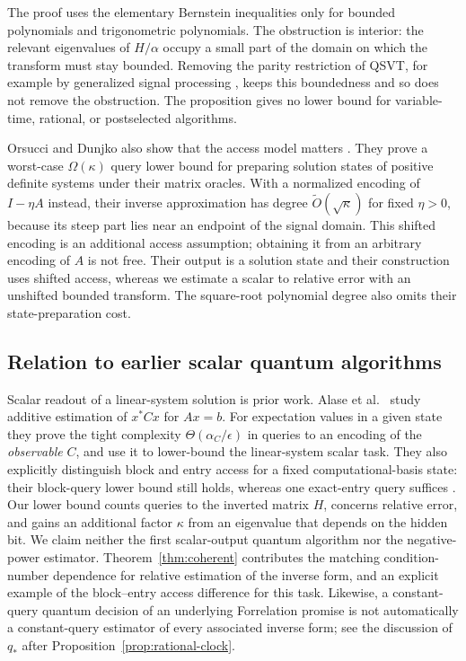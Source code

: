 The proof uses the elementary Bernstein inequalities only for bounded
polynomials and trigonometric polynomials.  The obstruction is interior: the relevant eigenvalues of $H/\alpha$
occupy a small part of the domain on which the transform must stay
bounded.  Removing the parity restriction of QSVT, for example by
generalized signal processing \citep{MotlaghWiebe2024}, keeps this
boundedness and so does not remove the obstruction.  The proposition gives no lower bound for variable-time,
rational, or postselected algorithms.

Orsucci and Dunjko also show that the access model matters
\citep[Proposition 6 and Sections 4.2--4.3]{OrsucciDunjko2021}.
They prove a worst-case $\Omega(\kappa)$ query lower bound for preparing
solution states of positive definite systems under their matrix oracles.
With a normalized encoding of $I-\eta A$ instead, their inverse
approximation has degree $\widetilde O(\sqrt\kappa)$ for
fixed $\eta>0$, because its steep part lies near an
endpoint of the signal domain.  This shifted encoding is an additional
access assumption; obtaining it from an arbitrary
encoding of $A$ is not free.  Their output is a solution state and their construction
uses shifted access, whereas we estimate a scalar to relative error with
an unshifted bounded transform.  The square-root polynomial degree
also omits their state-preparation cost.

\subsection{Relation to earlier scalar quantum algorithms}

Scalar readout of a linear-system solution is prior work.  Alase et al.\ \citep{AlaseEtAl2022} study
additive estimation of $x^*Cx$ for $Ax=b$.  For expectation values in a
given state they prove
the tight complexity $\Theta(\alpha_C/\epsilon)$ in queries to an encoding
of the \emph{observable} $C$, and use it to lower-bound the
linear-system scalar task.  They also explicitly distinguish block and entry access
for a fixed computational-basis state: their block-query lower
bound still holds, whereas one exact-entry query suffices
\citep[discussion after Theorem IV.13 and Appendix A]{AlaseEtAl2022}.
Our lower bound counts queries to the inverted matrix $H$, concerns
relative error, and gains an additional factor $\kappa$ from an
eigenvalue that depends on the hidden bit.  We claim neither the first
scalar-output quantum algorithm nor the negative-power estimator.
Theorem~\ref{thm:coherent} contributes the matching condition-number
dependence for relative estimation of the inverse form, and an
explicit example of the block--entry access difference for
this task.  Likewise, a constant-query quantum decision of an underlying
Forrelation promise is not automatically a constant-query estimator of
every associated inverse form; see the discussion of $q_*$ after
Proposition~\ref{prop:rational-clock}.
